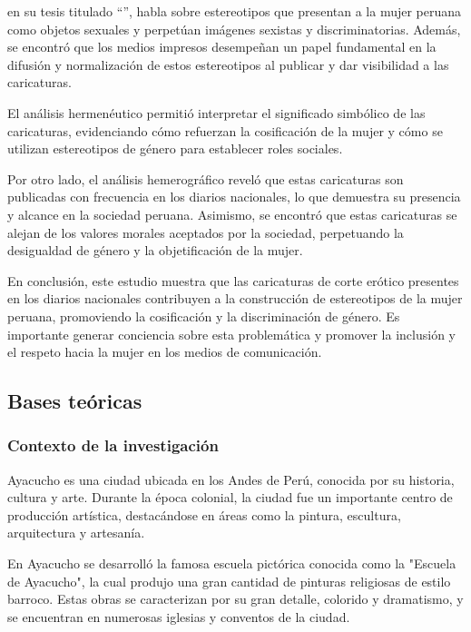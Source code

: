 \documentclass[12pt,a4paper]{article}
\begin{document}
\cite{taipe_herreras_construccion_2015} en su tesis titulado ``'', habla sobre estereotipos que presentan a la mujer peruana como objetos sexuales y perpetúan imágenes sexistas y discriminatorias. Además, se encontró que los medios impresos desempeñan un papel fundamental en la difusión y normalización de estos estereotipos al publicar y dar visibilidad a las caricaturas.

El análisis hermenéutico permitió interpretar el significado simbólico de las caricaturas, evidenciando cómo refuerzan la cosificación de la mujer y cómo se utilizan estereotipos de género para establecer roles sociales.

Por otro lado, el análisis hemerográfico reveló que estas caricaturas son publicadas con frecuencia en los diarios nacionales, lo que demuestra su presencia y alcance en la sociedad peruana. Asimismo, se encontró que estas caricaturas se alejan de los valores morales aceptados por la sociedad, perpetuando la desigualdad de género y la objetificación de la mujer.

En conclusión, este estudio muestra que las caricaturas de corte erótico presentes en los diarios nacionales contribuyen a la construcción de estereotipos de la mujer peruana, promoviendo la cosificación y la discriminación de género. Es importante generar conciencia sobre esta problemática y promover la inclusión y el respeto hacia la mujer en los medios de comunicación.

\subsection{Bases teóricas}
\subsubsection{Contexto de la investigación}
Ayacucho es una ciudad ubicada en los Andes de Perú, conocida por su historia, cultura y arte. Durante la época colonial, la ciudad fue un importante centro de producción artística, destacándose en áreas como la pintura, escultura, arquitectura y artesanía.

En Ayacucho se desarrolló la famosa escuela pictórica conocida como la "Escuela de Ayacucho", la cual produjo una gran cantidad de pinturas religiosas de estilo barroco. Estas obras se caracterizan por su gran detalle, colorido y dramatismo, y se encuentran en numerosas iglesias y conventos de la ciudad. \cite{velasco_historia_2008}
\end{document}
